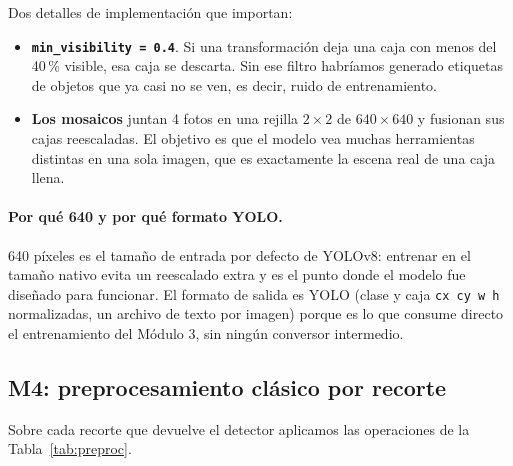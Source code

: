 \documentclass[11pt,a4paper]{article}
\begin{document}
Dos detalles de implementación que importan:

\begin{itemize}
  \item \textbf{\texttt{min\_visibility = 0.4}}. Si una transformación deja una caja con menos del
        40\,\% visible, esa caja se descarta. Sin ese filtro habríamos generado etiquetas de
        objetos que ya casi no se ven, es decir, ruido de entrenamiento.
  \item \textbf{Los mosaicos} juntan 4 fotos en una rejilla $2\times2$ de $640\times640$ y
        fusionan sus cajas reescaladas. El objetivo es que el modelo vea muchas herramientas
        distintas en una sola imagen, que es exactamente la escena real de una caja llena.
\end{itemize}

\paragraph{Por qué 640 y por qué formato YOLO.}
640 píxeles es el tamaño de entrada por defecto de YOLOv8: entrenar en el tamaño nativo evita un
reescalado extra y es el punto donde el modelo fue diseñado para funcionar. El formato de salida es
YOLO (clase y caja \texttt{cx cy w h} normalizadas, un archivo de texto por imagen) porque es lo
que consume directo el entrenamiento del Módulo 3, sin ningún conversor intermedio.

\subsection{M4: preprocesamiento clásico por recorte}

Sobre cada recorte que devuelve el detector aplicamos las operaciones de la
Tabla~\ref{tab:preproc}.
\end{document}
